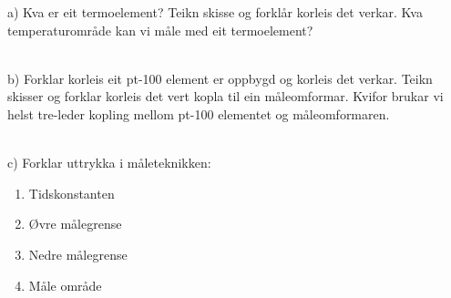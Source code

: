 




a) Kva er eit termoelement? Teikn skisse og forklår korleis det verkar. Kva temperaturområde kan vi måle med eit termoelement?
\\
\\
\eject
b) Forklar korleis eit pt-100 element er oppbygd og korleis det verkar. Teikn skisser og forklar korleis det vert kopla til ein måleomformar. Kvifor brukar vi helst tre-leder kopling mellom pt-100 elementet og måleomformaren.
\\
\\
c) Forklar uttrykka i måleteknikken: 
\begin{enumerate}
\item Tidskonstanten
\item Øvre målegrense
\item Nedre målegrense
\item Måle område
\end{enumerate}

\\

